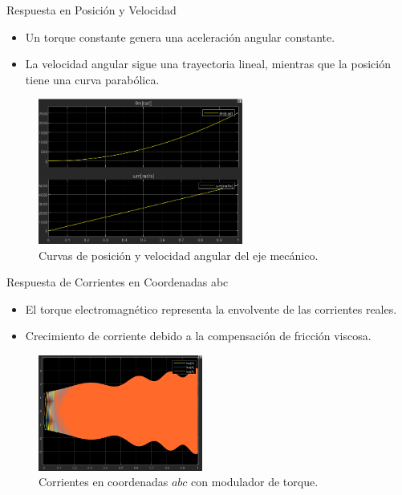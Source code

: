 \documentclass[12pt]{beamer}
\begin{document}
\begin{frame}{Respuesta en Posición y Velocidad}
    \begin{itemize}
        \item Un torque constante genera una aceleración angular constante.
        \item La velocidad angular sigue una trayectoria lineal, mientras que la posición tiene una curva parabólica.
    \end{itemize}
    \begin{figure}[H]
        \centering
        \includegraphics[width=0.6\textwidth]{Imagenes/Curvas_posicion_velocidad_modular_torque.png}
        \caption{Curvas de posición y velocidad angular del eje mecánico.}
        \label{fig:curvas_posicion_velocidad_modulador_torque}
    \end{figure}
\end{frame}

\begin{frame}{Respuesta de Corrientes en Coordenadas abc}
    \begin{itemize}
        \item El torque electromagnético representa la envolvente de las corrientes reales.
        \item Crecimiento de corriente debido a la compensación de fricción viscosa.
    \end{itemize}
    \begin{figure}[H]
        \centering
        \includegraphics[width=0.48\textwidth]{Imagenes/Curvas_corrientes_modulador_torque.png}
        \caption{Corrientes en coordenadas $abc$ con modulador de torque.}
        \label{fig:curvas_corrientesABC_modulador_torque}
    \end{figure}
\end{frame}
\end{document}

